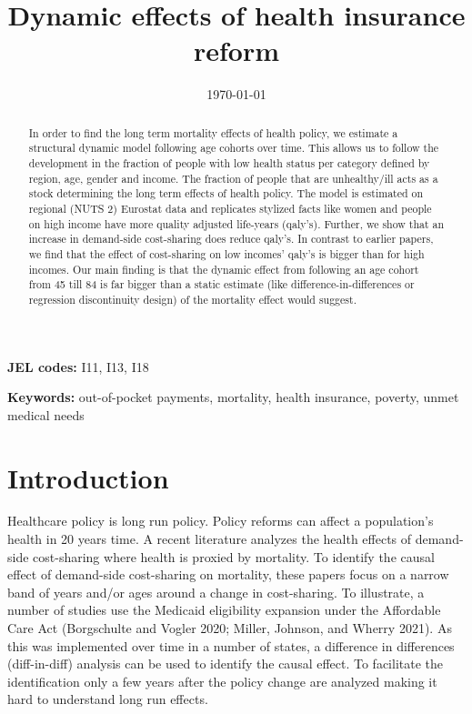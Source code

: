 \documentclass[a4paper,12pt]{article}
\date{\today}
\title{Dynamic effects of health insurance reform}
\makeatletter
\newcommand{\cslcitation}[2]
 {\protect\hyper@linkstart{cite}{citeproc_bib_item_#1}#2\hyper@linkend}
\makeatother
\begin{document}
\maketitle
\begin{abstract}
In order to find the long term mortality effects of health policy, we estimate a structural dynamic model following age cohorts over time. This allows us to follow the development in the fraction of people with low health status per category defined by region, age, gender and income. The fraction of people that are unhealthy/ill acts as a stock determining the long term effects of health policy. The model is estimated on regional (NUTS 2) Eurostat data and replicates stylized facts like women and people on high income have more quality adjusted life-years (qaly's). Further, we show that an increase in demand-side cost-sharing does reduce qaly's. In contrast to earlier papers, we find that the effect of cost-sharing on low incomes' qaly's is bigger than for high incomes. Our main finding is that the dynamic effect from following an age cohort from 45 till 84 is far bigger than a static estimate (like difference-in-differences or regression discontinuity design) of the mortality effect would suggest.
\end{abstract}


\textbf{JEL codes:} I11, I13, I18

\textbf{Keywords:} out-of-pocket payments, mortality, health insurance, poverty, unmet medical needs





\newpage
\section{Introduction}
\label{sec:orgf4829e6}

Healthcare policy is long run policy. Policy reforms can affect a population's health in 20 years time. A recent literature analyzes the health effects of demand-side cost-sharing where health is proxied by mortality. To identify the causal effect of demand-side cost-sharing on mortality, these papers focus on a narrow band of years and/or ages around a change in cost-sharing. To illustrate, a number of studies use the Medicaid eligibility expansion under the Affordable Care Act (\cslcitation{1}{Borgschulte and Vogler 2020}; \cslcitation{7}{Miller, Johnson, and Wherry 2021}). As this was implemented over time in a number of states, a difference in differences (diff-in-diff) analysis can be used to identify the causal effect. To facilitate the identification only a few years after the policy change are analyzed making it hard to understand long run effects.
\end{document}
